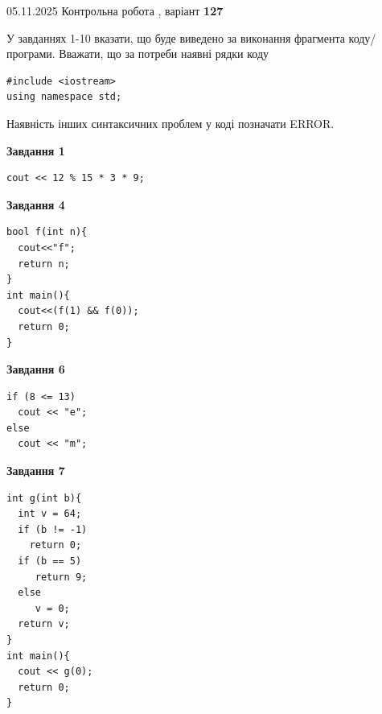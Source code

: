 \documentclass[12pt, ukrainian]{article}
\begin{document}
{\Large{05.11.2025 Контрольна робота , варіант  \No \textbf { 127 }\par}}
{
\begin {large}
У завданнях 1-10 вказати, що буде виведено за виконання фрагмента коду/про\-гра\-ми.
Вважати, що за потреби наявні рядки коду
\begin{verbatim}
#include <iostream>
using namespace std;
\end{verbatim}
Наявність інших синтаксичних проблем у коді позначати ERROR.

\begin{minipage}[t]{7.0cm}

\begin{center}
\textbf{Завдання 1}
\end{center}
\vspace{-8mm}

\begin{verbatim}
cout << 12 % 15 * 3 * 9;
\end{verbatim}



\begin{center}
\textbf{Завдання 4}
\end{center}
\vspace{-8mm}

\begin{verbatim}
bool f(int n){
  cout<<"f";
  return n;
}
int main(){
  cout<<(f(1) && f(0));
  return 0;
}
\end{verbatim}



\begin{center}
\textbf{Завдання 6}
\end{center}
\vspace{-8mm}

\begin{verbatim}
if (8 <= 13)
  cout << "e";
else
  cout << "m";
\end{verbatim}



\begin{center}
\textbf{Завдання 7}
\end{center}
\vspace{-8mm}

\begin{verbatim}
int g(int b){
  int v = 64;
  if (b != -1)
    return 0;
  if (b == 5)
     return 9;
  else
     v = 0;
  return v;
}
int main(){
  cout << g(0);
  return 0;
}
\end{verbatim}


\end{minipage}
\end{large}}
\end{document}
